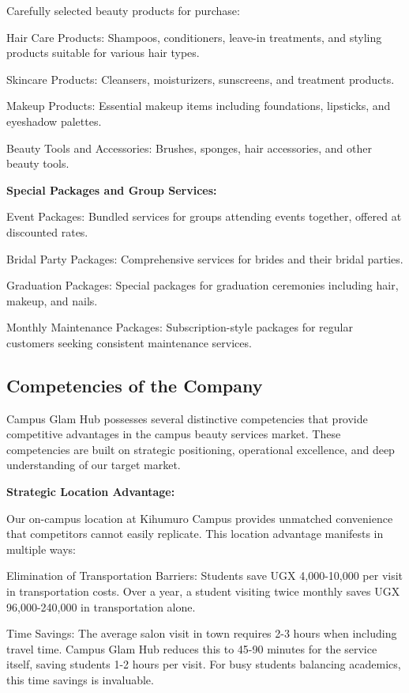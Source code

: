 Carefully selected beauty products for purchase:

Hair Care Products: Shampoos, conditioners, leave-in treatments, and styling products suitable for various hair types.

Skincare Products: Cleansers, moisturizers, sunscreens, and treatment products.

Makeup Products: Essential makeup items including foundations, lipsticks, and eyeshadow palettes.

Beauty Tools and Accessories: Brushes, sponges, hair accessories, and other beauty tools.

\textbf{Special Packages and Group Services:}

Event Packages: Bundled services for groups attending events together, offered at discounted rates.

Bridal Party Packages: Comprehensive services for brides and their bridal parties.

Graduation Packages: Special packages for graduation ceremonies including hair, makeup, and nails.

Monthly Maintenance Packages: Subscription-style packages for regular customers seeking consistent maintenance services.

\subsection{Competencies of the Company}

Campus Glam Hub possesses several distinctive competencies that provide competitive advantages in the campus beauty services market. These competencies are built on strategic positioning, operational excellence, and deep understanding of our target market.

\textbf{Strategic Location Advantage:}

Our on-campus location at Kihumuro Campus provides unmatched convenience that competitors cannot easily replicate. This location advantage manifests in multiple ways:

Elimination of Transportation Barriers: Students save UGX 4,000-10,000 per visit in transportation costs. Over a year, a student visiting twice monthly saves UGX 96,000-240,000 in transportation alone.

Time Savings: The average salon visit in town requires 2-3 hours when including travel time. Campus Glam Hub reduces this to 45-90 minutes for the service itself, saving students 1-2 hours per visit. For busy students balancing academics, this time savings is invaluable.

